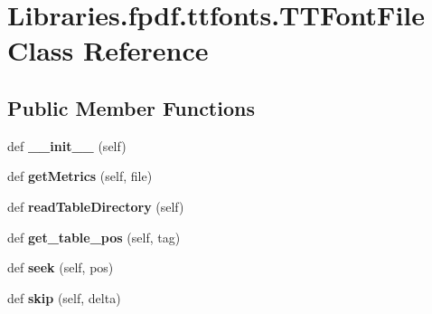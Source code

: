 \hypertarget{class_libraries_1_1fpdf_1_1ttfonts_1_1_t_t_font_file}{}\section{Libraries.\+fpdf.\+ttfonts.\+T\+T\+Font\+File Class Reference}
\label{class_libraries_1_1fpdf_1_1ttfonts_1_1_t_t_font_file}
\subsection*{Public Member Functions}
\begin{DoxyCompactItemize}
\item 
def {\bfseries \+\_\+\+\_\+init\+\_\+\+\_\+} (self)\hypertarget{class_libraries_1_1fpdf_1_1ttfonts_1_1_t_t_font_file_a6982e30cc8c8253c11a372736aa8919e}{}\label{class_libraries_1_1fpdf_1_1ttfonts_1_1_t_t_font_file_a6982e30cc8c8253c11a372736aa8919e}

\item 
def {\bfseries get\+Metrics} (self, file)\hypertarget{class_libraries_1_1fpdf_1_1ttfonts_1_1_t_t_font_file_a399d9f1ebee205ecefe1c54eed72fcb7}{}\label{class_libraries_1_1fpdf_1_1ttfonts_1_1_t_t_font_file_a399d9f1ebee205ecefe1c54eed72fcb7}

\item 
def {\bfseries read\+Table\+Directory} (self)\hypertarget{class_libraries_1_1fpdf_1_1ttfonts_1_1_t_t_font_file_a247832c784b0c9d8807cc07686c01395}{}\label{class_libraries_1_1fpdf_1_1ttfonts_1_1_t_t_font_file_a247832c784b0c9d8807cc07686c01395}

\item 
def {\bfseries get\+\_\+table\+\_\+pos} (self, tag)\hypertarget{class_libraries_1_1fpdf_1_1ttfonts_1_1_t_t_font_file_acb4c8f0d09fb520be7499eb6c812ebab}{}\label{class_libraries_1_1fpdf_1_1ttfonts_1_1_t_t_font_file_acb4c8f0d09fb520be7499eb6c812ebab}

\item 
def {\bfseries seek} (self, pos)\hypertarget{class_libraries_1_1fpdf_1_1ttfonts_1_1_t_t_font_file_a49c515f74200b414529bff9c45d3da17}{}\label{class_libraries_1_1fpdf_1_1ttfonts_1_1_t_t_font_file_a49c515f74200b414529bff9c45d3da17}

\item 
def {\bfseries skip} (self, delta)\hypertarget{class_libraries_1_1fpdf_1_1ttfonts_1_1_t_t_font_file_a19c937605ea879c1474f246c1f7ea491}{}\label{class_libraries_1_1fpdf_1_1ttfonts_1_1_t_t_font_file_a19c937605ea879c1474f246c1f7ea491}


\end{DoxyCompactItemize}

